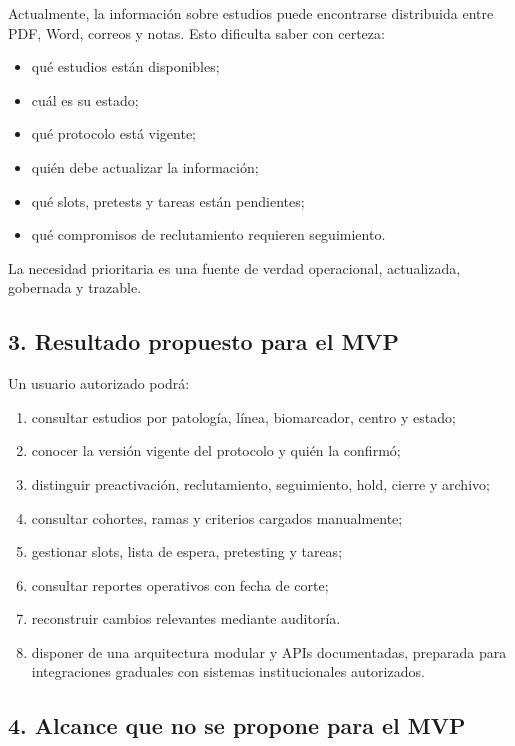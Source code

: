 \documentclass[
]{article}
\providecommand{\tightlist}{%
  \setlength{\itemsep}{0pt}\setlength{\parskip}{0pt}}
\begin{document}
Actualmente, la información sobre estudios puede encontrarse distribuida
entre PDF, Word, correos y notas. Esto dificulta saber con certeza:

\begin{itemize}
\tightlist
\item
  qué estudios están disponibles;
\item
  cuál es su estado;
\item
  qué protocolo está vigente;
\item
  quién debe actualizar la información;
\item
  qué slots, pretests y tareas están pendientes;
\item
  qué compromisos de reclutamiento requieren seguimiento.
\end{itemize}

La necesidad prioritaria es una fuente de verdad operacional,
actualizada, gobernada y trazable.

\hypertarget{3-resultado-propuesto-para-el-mvp}{%
\subsection{3. Resultado propuesto para el
MVP}\label{3-resultado-propuesto-para-el-mvp}}

Un usuario autorizado podrá:

\begin{enumerate}
\def\labelenumi{\arabic{enumi}.}
\tightlist
\item
  consultar estudios por patología, línea, biomarcador, centro y estado;
\item
  conocer la versión vigente del protocolo y quién la confirmó;
\item
  distinguir preactivación, reclutamiento, seguimiento, hold, cierre y
  archivo;
\item
  consultar cohortes, ramas y criterios cargados manualmente;
\item
  gestionar slots, lista de espera, pretesting y tareas;
\item
  consultar reportes operativos con fecha de corte;
\item
  reconstruir cambios relevantes mediante auditoría.
\item
  disponer de una arquitectura modular y APIs documentadas, preparada
  para integraciones graduales con sistemas institucionales autorizados.
\end{enumerate}

\hypertarget{4-alcance-que-no-se-propone-para-el-mvp}{%
\subsection{4. Alcance que no se propone para el
MVP}\label{4-alcance-que-no-se-propone-para-el-mvp}}
\end{document}
